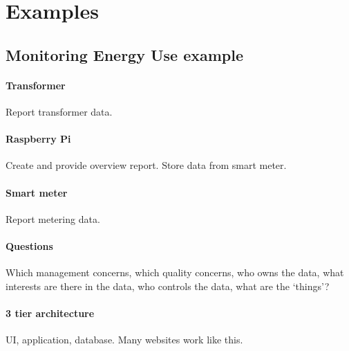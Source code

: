 \documentclass[11pt]{article}
\begin{document}
    \section{Examples}

    \subsection{Monitoring Energy Use example}

    \paragraph{Transformer}
    Report transformer data.
    \paragraph{Raspberry Pi}
    Create and provide overview report.
    Store data from smart meter.
    \paragraph{Smart meter}
    Report metering data.

    \paragraph{Questions}
    Which management concerns, which quality concerns, who owns the data,
    what interests are there in the data, who controls the data, what are the `things'?

    \paragraph{3 tier architecture}
    UI, application, database.
    Many websites work like this.




    
\end{document}
